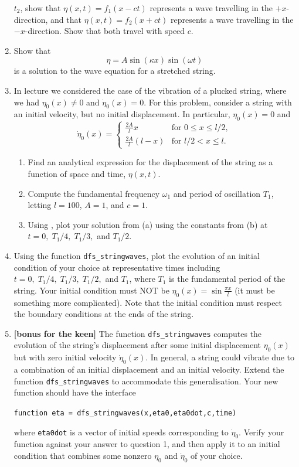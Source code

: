 \documentclass[12pt,twoside,a4paper]{article}
\begin{document}
\begin{enumerate}
  $t_2$, show that $\eta(x,t) = f_1(x-ct)$ represents a wave
  travelling in the $+x$-direction, and that $\eta(x,t) = f_2(x+ct)$
  represents a wave travelling in the $-x$-direction.  Show that both
  travel with speed $c$.
\item Show that
  \begin{displaymath}
    \eta = A \sin(\kappa x)\sin(\omega t)
  \end{displaymath}
  is a solution to the wave equation for a stretched string.
\item In lecture we considered the case of the vibration of a plucked
  string, where we had $\eta_0(x)\ne0$ and $\dot{\eta}_0(x)=0$.  For
  this problem, consider a string with an initial velocity, but no
  initial displacement. In particular, $\eta_0(x)=0$ and
  \begin{displaymath}
    \dot{\eta}_0(x) =
    \begin{cases}
      \frac{2A}{l}x & \text{for $0\le x\le l/2$},\\
      \frac{2A}{l}(l-x) & \text{for $l/2 < x\le l$}.
    \end{cases}
  \end{displaymath}
  \begin{enumerate}
  \item Find an analytical expression for the displacement of the
    string as a function of space and time, $\eta(x,t)$.
  \item Compute the fundamental frequency $\omega_1$ and period of
    oscillation $T_1$, letting $l=100$, $A=1$, and $c=1$.
  \item Using \Mlab, plot your solution from (a) using the constants
    from (b) at $t = 0,\; T_1/4,\; T_1/3,$ and $T_1/2$.
  \end{enumerate}
\item Using the \Mlab function \texttt{dfs\_stringwaves}, plot the
  evolution of an initial condition of your choice at representative
  times including $t=0,\; T_1/4,\; T_1/3,\; T_1/2,$ and $T_1$, where
  $T_1$ is the fundamental period of the string.  Your initial
  condition must NOT be $\eta_0(x) = \sin\frac{\pi x}{l}$ (it must be
  something more complicated).  Note that the initial condition must
  respect the boundary conditions at the ends of the string.
\item \textbf{[bonus for the keen]} The function
  \texttt{dfs\_stringwaves} computes the evolution of the string's
  displacement after some initial displacement $\eta_0(x)$ but with
  zero initial velocity $\dot{\eta}_0(x)$.  In general, a string could
  vibrate due to a combination of an initial displacement and an
  initial velocity.  Extend the function \texttt{dfs\_stringwaves} to
  accommodate this generalisation.  Your new function should have the
  interface
  \begin{center}
    \texttt{function eta = dfs\_stringwaves(x,eta0,eta0dot,c,time)}
  \end{center}
  where \texttt{eta0dot} is a vector of initial speeds corresponding
  to $\dot{\eta}_0$. Verify your function against your answer to
  question 1, and then apply it to an initial condition that combines
  some nonzero $\eta_0$ and $\dot{\eta}_0$ of your choice.
\end{enumerate}
\end{document}
